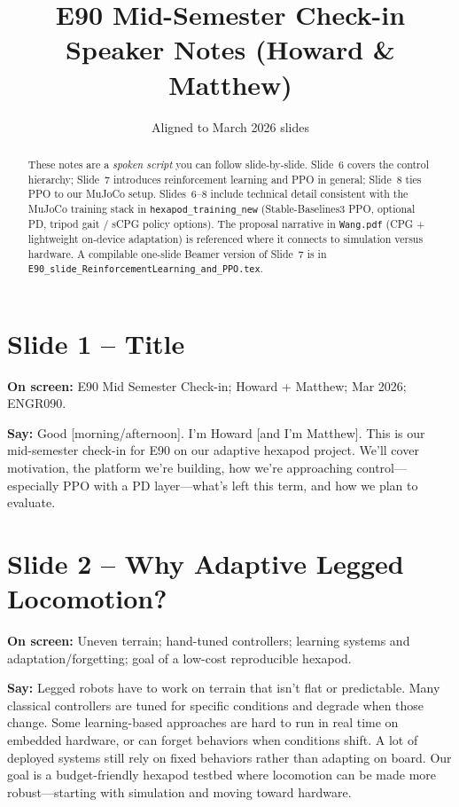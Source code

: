 \documentclass[11pt]{article}
\title{E90 Mid-Semester Check-in\\Speaker Notes (Howard \& Matthew)}
\author{Aligned to March 2026 slides}
\date{}
\begin{document}
\maketitle

\begin{abstract}
\noindent
These notes are a \emph{spoken script} you can follow slide-by-slide. Slide~6 covers the control hierarchy; Slide~7 introduces reinforcement learning and PPO in general; Slide~8 ties PPO to our MuJoCo setup. Slides~6--8 include technical detail consistent with the MuJoCo training stack in \texttt{hexapod\_training\_new} (Stable-Baselines3 PPO, optional PD, tripod gait / sCPG policy options). The proposal narrative in \texttt{Wang.pdf} (CPG + lightweight on-device adaptation) is referenced where it connects to simulation versus hardware. A compilable one-slide Beamer version of Slide~7 is in \texttt{E90\_slide\_ReinforcementLearning\_and\_PPO.tex}.
\end{abstract}

\tableofcontents
\newpage

\section{Slide 1 -- Title}
\textbf{On screen:} E90 Mid Semester Check-in; Howard + Matthew; Mar 2026; ENGR090.

\textbf{Say:}
Good [morning/afternoon]. I'm Howard [and I'm Matthew]. This is our mid-semester check-in for E90 on our adaptive hexapod project. We'll cover motivation, the platform we're building, how we're approaching control---especially PPO with a PD layer---what's left this term, and how we plan to evaluate.

\section{Slide 2 -- Why Adaptive Legged Locomotion?}
\textbf{On screen:} Uneven terrain; hand-tuned controllers; learning systems and adaptation/forgetting; goal of a low-cost reproducible hexapod.

\textbf{Say:}
Legged robots have to work on terrain that isn't flat or predictable. Many classical controllers are tuned for specific conditions and degrade when those change. Some learning-based approaches are hard to run in real time on embedded hardware, or can forget behaviors when conditions shift. A lot of deployed systems still rely on fixed behaviors rather than adapting on board. Our goal is a budget-friendly hexapod testbed where locomotion can be made more robust---starting with simulation and moving toward hardware.
\end{document}
